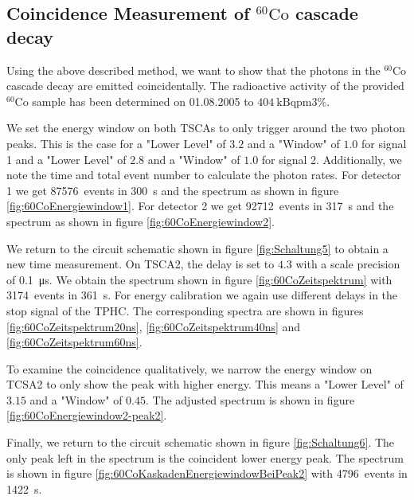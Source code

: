 \subsection{Coincidence Measurement of $^{60}\text{Co}$ cascade decay}
%
Using the above described method, we want to show that the photons in the $^{60}\text{Co}$ cascade decay are emitted coincidentally.
The radioactive activity of the provided $^{60}\text{Co}$ sample has been determined on 01.08.2005 to $\SI{404}{\kilo\becquerel \pm 3 \percent}$.
%
\par
%
We set the energy window on both TSCAs to only trigger around the two photon peaks.
This is the case for a "Lower Level" of $3.2$ and a "Window" of $1.0$ for signal 1 and a "Lower Level" of $2.8$ and a "Window" of $1.0$ for signal 2.
Additionally, we note the time and total event number to calculate the photon rates.
For detector 1 we get \SI{87576}{events} in \SI{300}{\second} and the spectrum as shown in figure \ref{fig:60CoEnergiewindow1}.
For detector 2 we get \SI{92712}{events} in \SI{317}{\second} and the spectrum as shown in figure \ref{fig:60CoEnergiewindow2}.
%
\par
%
We return to the circuit schematic shown in figure \ref{fig:Schaltung5} to obtain a new time measurement.
On TSCA2, the delay is set to $4.3$ with a scale precision of \SI{0.1}{\micro\second}.
We obtain the spectrum shown in figure \ref{fig:60CoZeitspektrum} with \SI{3174}{events} in \SI{361}{\second}.
For energy calibration we again use different delays in the stop signal of the TPHC.
The corresponding spectra are shown in figures \ref{fig:60CoZeitspektrum20ns}, \ref{fig:60CoZeitspektrum40ns} and \ref{fig:60CoZeitspektrum60ns}.
%
\par
%
To examine the coincidence qualitatively, we narrow the energy window on TCSA2 to only show the peak with higher energy.
This means a "Lower Level" of $3.15$ and a "Window" of $0.45$.
The adjusted spectrum is shown in figure \ref{fig:60CoEnergiewindow2-peak2}.
%
\par
%
Finally, we return to the circuit schematic shown in figure \ref{fig:Schaltung6}.
The only peak left in the spectrum is the coincident lower energy peak.
The spectrum is shown in figure \ref{fig:60CoKaskadenEnergiewindowBeiPeak2} with \SI{4796}{events} in \SI{1422}{\second}.
%
